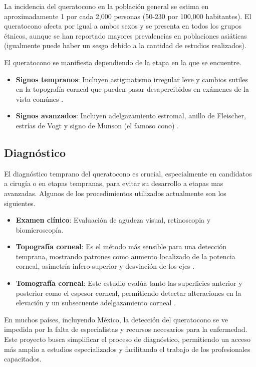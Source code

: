 \documentclass{replab}
\begin{document}
La incidencia del queratocono en la población general se estima en aproximadamente 1 por cada 2,000 personas (50-230 por 100,000 habitantes). El queratocono afecta por igual a ambos sexos y se presenta en todos los grupos étnicos, aunque se han reportado mayores prevalencias en poblaciones asiáticas (igualmente puede haber un sesgo debido a la cantidad de estudios realizados). \cite{rabinowitz, namba}

El queratocono se manifiesta dependiendo de la etapa en la que se encuentre.

\begin{itemize}[itemsep=-2pt]
    \item \textbf{Signos tempranos}: Incluyen astigmatismo irregular leve y cambios sutiles en la topografía corneal que pueden pasar desapercibidos en exámenes de la vista comúnes \cite{rabinowitz}.
    \item \textbf{Signos avanzados}: Incluyen adelgazamiento estromal, anillo de Fleischer, estrías de Vogt y signo de Munson (el famoso cono) \cite{rabinowitz}.
\end{itemize}

\subsection{Diagnóstico}

El diagnóstico temprano del queratocono es crucial, especialmente en candidatos a cirugía o en etapas tempranas, para evitar su desarrollo a etapas mas avanzadas. Algunos de los procedimientos utilizados actualmente son los siguientes.

\begin{itemize}[itemsep=-2pt]
    \item \textbf{Examen clínico}: Evaluación de agudeza visual, retinoscopia y biomicroscopía.
    \item \textbf{Topografía corneal}: Es el método más sensible para una detección temprana, mostrando patrones como aumento localizado de la potencia corneal, asimetría infero-superior y desviación de los ejes \cite{rabinowitz}.
    \item \textbf{Tomografía corneal}: Este estudio evalúa tanto las superficies anterior y posterior como el espesor corneal, permitiendo detectar alteraciones en la elevación y un subsecuente adelgazamiento corneal \cite{namba}.
\end{itemize}

En muchos países, incluyendo México, la detección del queratocono se ve impedida por la falta de especialistas y recursos necesarios para la enfermedad. Este proyecto busca simplificar el proceso de diagnóstico, permitiendo un acceso más amplio a estudios especializados y facilitando el trabajo de los profesionales capacitados.
\end{document}
